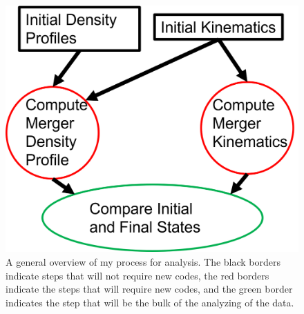 \documentclass[linenumbers]{aastex631}
\begin{document}
\begin{figure}[h]
    \centering
    \includegraphics{MethodsFlowchart400B.png}
    \caption{A general overview of my process for analysis. The black borders indicate steps that will not require new codes, the red borders indicate the steps that will require new codes, and the green border indicates the step that will be the bulk of the analyzing of the data.}
    \label{fig:2}
\end{figure}


\end{document}
